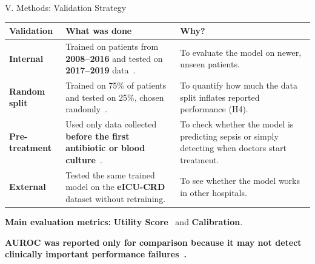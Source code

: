 \begin{frame}{V. Methods: Validation Strategy}
\renewcommand{\arraystretch}{1.15}\footnotesize
\begin{center}
\begin{tabular}{p{2cm}p{6.4cm}p{4.8cm}}
\toprule
\textbf{Validation} & \textbf{What was done} & \textbf{Why?} \\
\midrule
\textbf{Internal}
  & Trained on patients from \textbf{2008--2016} and tested on
    \textbf{2017--2019} data~\cite{guo2022temporal}.
  & To evaluate the model on newer, unseen patients. \\[2pt]
\textbf{Random split}
  & Trained on 75\% of patients and tested on 25\%, chosen
    randomly~\cite{guo2022temporal}.
  & To quantify how much the data split inflates reported
    performance (H4). \\[2pt]
\textbf{Pre-treatment}
  & Used only data collected \textbf{before the first antibiotic or blood
    culture}~\cite{kamran2024evaluation}.
  & To check whether the model is predicting sepsis or simply detecting when
    doctors start treatment. \\[2pt]
\textbf{External}
  & Tested the same trained model on the
    \textbf{eICU-CRD}~\cite{pollard2018eicu} dataset without retraining.
  & To see whether the model works in other hospitals. \\
\bottomrule
\end{tabular}
\end{center}

\vspace{2pt}
{\small\textbf{Main evaluation metrics:} \textbf{Utility
Score}~\cite{reyna2020utility} and \textbf{Calibration}.\par}

\vspace{1pt}
{\small\textbf{AUROC was reported only for comparison because it may not
detect clinically important performance
failures~\cite{wang2025srpm}.}\par}
\end{frame}



